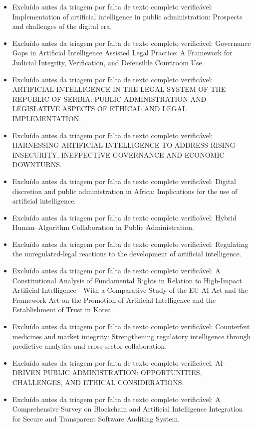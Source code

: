 \documentclass[12pt,a4paper]{article}
\begin{document}
\begin{itemize}
\item Excluído antes da triagem por falta de texto completo verificável: Implementation of artificial intelligence in public administration: Prospects and challenges of the digital era.
\item Excluído antes da triagem por falta de texto completo verificável: Governance Gaps in Artificial Intelligence Assisted Legal Practice: A Framework for Judicial Integrity, Verification, and Defensible Courtroom Use.
\item Excluído antes da triagem por falta de texto completo verificável: ARTIFICIAL INTELLIGENCE IN THE LEGAL SYSTEM OF THE REPUBLIC OF SERBIA: PUBLIC ADMINISTRATION AND LEGISLATIVE ASPECTS OF ETHICAL AND LEGAL IMPLEMENTATION.
\item Excluído antes da triagem por falta de texto completo verificável: HARNESSING ARTIFICIAL INTELLIGENCE TO ADDRESS RISING INSECURITY, INEFFECTIVE GOVERNANCE AND ECONOMIC DOWNTURNS.
\item Excluído antes da triagem por falta de texto completo verificável: Digital discretion and public administration in Africa: Implications for the use of artificial intelligence.
\item Excluído antes da triagem por falta de texto completo verificável: Hybrid Human–Algorithm Collaboration in Public Administration.
\item Excluído antes da triagem por falta de texto completo verificável: Regulating the unregulated-legal reactions to the development of artificial intelligence.
\item Excluído antes da triagem por falta de texto completo verificável: A Constitutional Analysis of Fundamental Rights in Relation to High-Impact Artificial Intelligence - With a Comparative Study of the EU AI Act and the Framework Act on the Promotion of Artificial Intelligence and the Establishment of Trust in Korea.
\item Excluído antes da triagem por falta de texto completo verificável: Counterfeit medicines and market integrity: Strengthening regulatory intelligence through predictive analytics and cross-sector collaboration.
\item Excluído antes da triagem por falta de texto completo verificável: AI-DRIVEN PUBLIC ADMINISTRATION: OPPORTUNITIES, CHALLENGES, AND ETHICAL CONSIDERATIONS.
\item Excluído antes da triagem por falta de texto completo verificável: A Comprehensive Survey on Blockchain and Artificial Intelligence Integration for Secure and Transparent Software Auditing System.

\end{itemize}
\end{document}
